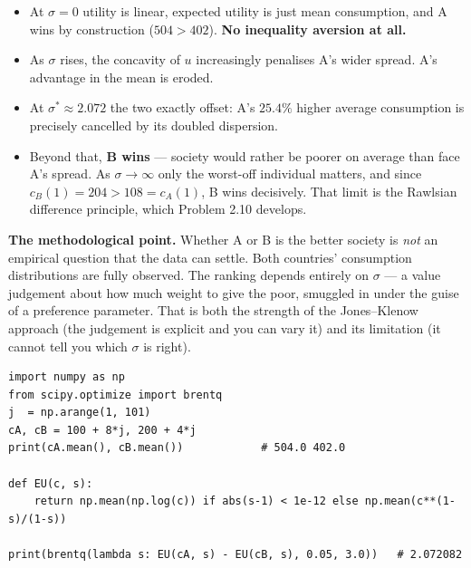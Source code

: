\documentclass[12pt, letterpaper]{article}
\begin{document}
\begin{tcolorbox}[evenbox,title={Problem 2.8 \quad Inequality and Risk Aversion}]
\begin{enumerate}
\begin{itemize}[leftmargin=1.3em,itemsep=3pt,topsep=2pt]
\item At $\sigma = 0$ utility is linear, expected utility is just mean consumption, and A
wins by construction ($504 > 402$). \textbf{No inequality aversion at all.}
\item As $\sigma$ rises, the concavity of $u$ increasingly penalises A's wider spread. A's
advantage in the mean is eroded.
\item At $\sigma^{\ast} \approx 2.072$ the two exactly offset: A's $25.4\%$ higher average
consumption is precisely cancelled by its doubled dispersion.
\item Beyond that, \textbf{B wins} --- society would rather be poorer on average than face
A's spread. As $\sigma \to \infty$ only the worst-off individual matters, and since
$c_B(1) = 204 > 108 = c_A(1)$, B wins decisively. That limit is the Rawlsian
difference principle, which Problem 2.10 develops.
\end{itemize}

\textbf{The methodological point.} Whether A or B is the better society is \emph{not} an
empirical question that the data can settle. Both countries' consumption distributions are
fully observed. The ranking depends entirely on $\sigma$ --- a value judgement about how much
weight to give the poor, smuggled in under the guise of a preference parameter. That is both
the strength of the Jones--Klenow approach (the judgement is explicit and you can vary it) and
its limitation (it cannot tell you which $\sigma$ is right).

\end{enumerate}

\begin{tcolorbox}[theorybox,title={Verification code (executed)}]
\footnotesize
\begin{verbatim}
import numpy as np
from scipy.optimize import brentq
j  = np.arange(1, 101)
cA, cB = 100 + 8*j, 200 + 4*j
print(cA.mean(), cB.mean())            # 504.0 402.0

def EU(c, s):
    return np.mean(np.log(c)) if abs(s-1) < 1e-12 else np.mean(c**(1-s)/(1-s))

print(brentq(lambda s: EU(cA, s) - EU(cB, s), 0.05, 3.0))   # 2.072082
\end{verbatim}
\end{tcolorbox}
\end{tcolorbox}
\end{document}
